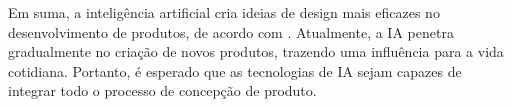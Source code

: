 Em suma, a inteligência artificial cria ideias de design mais eficazes no desenvolvimento de produtos, de acordo com . Atualmente, a IA penetra gradualmente no criação de novos produtos, trazendo uma influência para a vida cotidiana. Portanto, é esperado que as tecnologias de IA sejam capazes de integrar todo o processo de concepção de produto.
